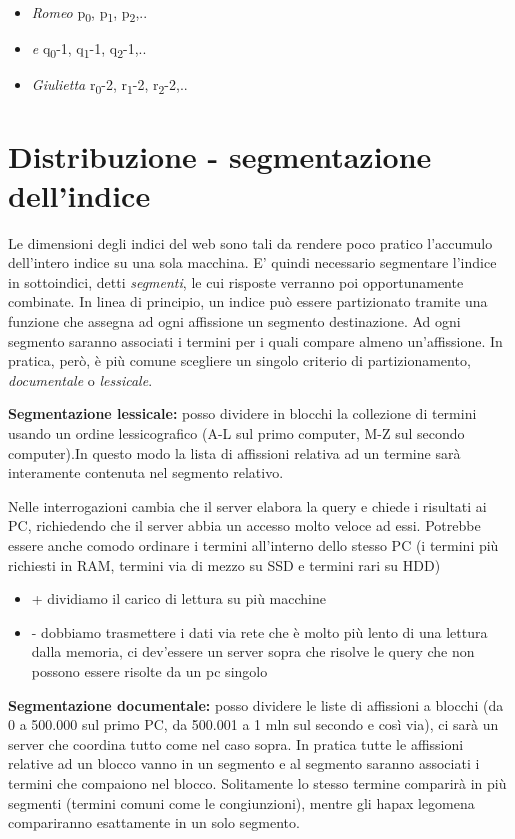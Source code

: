 \documentclass[12pt,italian]{report}
\begin{document}
\begin{itemize}
    \item \textit{Romeo} p\textsubscript{0}, p\textsubscript{1}, p\textsubscript{2},..
    \item \textit{e}  q\textsubscript{0}-1, q\textsubscript{1}-1, q\textsubscript{2}-1,..
    \item \textit{Giulietta } r\textsubscript{0}-2, r\textsubscript{1}-2, r\textsubscript{2}-2,..
\end{itemize}

\section{Distribuzione - segmentazione dell'indice}
\label{indici distribuiti}

Le dimensioni degli indici del web sono tali da rendere poco pratico l'accumulo dell'intero indice su una sola macchina. E' quindi necessario segmentare l'indice in sottoindici, detti \textit{segmenti}, le cui risposte verranno poi opportunamente
combinate. In linea di principio, un indice può essere partizionato tramite una funzione che assegna ad ogni affissione un segmento destinazione. Ad ogni segmento saranno associati i termini per i quali compare almeno un'affissione.
In pratica, però, è più comune scegliere un singolo criterio di partizionamento, \textit{documentale} o \textit{lessicale}.
\bigbreak

\noindent \textbf{Segmentazione lessicale:}
\noindent posso dividere in blocchi la collezione di termini usando un ordine lessicografico (A-L sul primo computer, M-Z sul secondo computer).In questo modo la lista di affissioni relativa ad un termine sarà interamente contenuta nel segmento relativo.

Nelle interrogazioni cambia che il server elabora la query e chiede i risultati ai PC, richiedendo che il server abbia un accesso molto veloce ad essi. Potrebbe essere anche comodo ordinare i termini all'interno dello stesso PC (i termini più richiesti in RAM, termini via di mezzo su SSD e termini rari su HDD)

\begin{itemize}
    \item + dividiamo il carico di lettura su più macchine
    \item - dobbiamo trasmettere i dati via rete che è molto più lento di una lettura dalla memoria, ci dev'essere un server sopra che risolve le query che non possono essere risolte da un pc singolo
\end{itemize}
\bigbreak
\noindent \textbf{Segmentazione documentale:}
\noindent posso dividere le liste di affissioni a blocchi (da 0 a 500.000 sul primo PC, da 500.001 a 1 mln sul secondo e così via), ci sarà un server che coordina tutto come nel caso sopra. In pratica tutte le affissioni relative ad un blocco vanno in un segmento e al segmento saranno associati i termini che compaiono nel blocco. Solitamente lo stesso termine comparirà in più segmenti (termini comuni come le congiunzioni), mentre gli hapax legomena compariranno esattamente in un solo segmento. 
\end{document}

